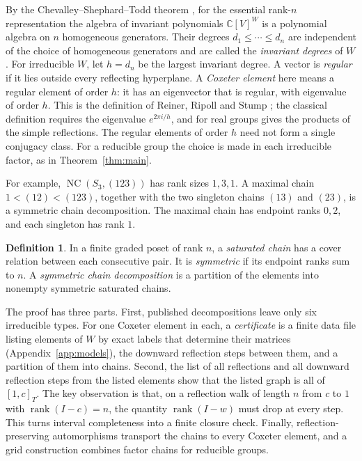 \documentclass[11pt]{article}
\theoremstyle{definition}
\newtheorem{definition}[theorem]{Definition}
\newcommand{\C}{\mathbb C}
\newcommand{\NC}{\operatorname{NC}}
\newcommand{\rank}{\operatorname{rank}}
\begin{document}
By the Chevalley--Shephard--Todd theorem
\cite[Theorem~5.1]{ST}\cite[Theorem~(A)]{Chevalley}, for the essential
rank-$n$ representation the algebra of invariant
polynomials $\C[V]^W$ is a polynomial algebra on $n$ homogeneous
generators. Their degrees $d_1\leq\cdots\leq d_n$ are independent
of the choice of homogeneous generators and are called the
\emph{invariant degrees} of $W$. For irreducible $W$, let $h=d_n$
be the largest invariant degree. A vector
is \emph{regular} if it lies outside every reflecting hyperplane. A
\emph{Coxeter element} here means a regular element of order $h$: it
has an eigenvector that is regular, with eigenvalue of order $h$.
This is the definition of Reiner, Ripoll and Stump
\cite[Definition~1.1 and the paragraph after it]{RRS}; the classical definition requires the
eigenvalue $e^{2\pi i/h}$, and for real groups gives the products of
the simple reflections. The regular elements of order $h$ need not form
a single conjugacy class. For a reducible group the choice is made in
each irreducible factor, as in Theorem~\ref{thm:main}.

For example, $\NC(S_3,(123))$ has rank sizes $1,3,1$. A maximal chain
$1<(12)<(123)$, together with the two singleton chains $(13)$ and
$(23)$, is a symmetric chain decomposition. The maximal chain has
endpoint ranks $0,2$, and each singleton has rank $1$.

\begin{definition}
In a finite graded poset of rank $n$, a \emph{saturated chain} has a
cover relation between each consecutive pair. It is \emph{symmetric}
if its endpoint ranks sum to $n$. A \emph{symmetric chain
decomposition} is a partition of the elements into nonempty symmetric
saturated chains.
\end{definition}

The proof has three parts. First, published decompositions leave only
six irreducible types. For one Coxeter element in each, a
\emph{certificate} is a finite data file listing elements of $W$ by
exact labels that determine their matrices (Appendix~\ref{app:models}),
the downward reflection steps between them, and a partition of them
into chains. Second, the list of all reflections and all downward
reflection steps from the listed elements show that the listed graph is
all of $[1,c]_T$. The key observation is that, on a
reflection walk of length $n$ from $c$ to $1$ with
$\rank(I-c)=n$, the quantity $\rank(I-w)$ must drop at every step.
This turns interval completeness into a finite closure check.
Finally, reflection-preserving automorphisms transport the chains to
every Coxeter element, and a grid construction combines factor chains
for reducible groups.
\end{document}
